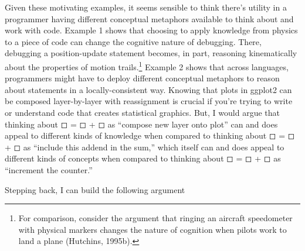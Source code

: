 Given these motivating examples, it seems sensible to think there's
utility in a programmer having different conceptual metaphors available
to think about and work with code. Example 1 shows that choosing to
apply knowledge from physics to a piece of code can change the cognitive
nature of debugging. There, debugging a position-update statement
becomes, in part, reasoning kinematically about the properties of motion
trails.\footnote{For comparison, consider the argument that ringing an
  aircraft speedometer with physical markers changes the nature of
  cognition when pilots work to land a plane (Hutchins, 1995b).} Example
2 shows that across languages, programmers might have to deploy
different conceptual metaphors to reason about statements in a
locally-consistent way. Knowing that plots in ggplot2 can be composed
layer-by-layer with reassignment is crucial if you're trying to write or
understand code that creates statistical graphics. But, I would argue
that thinking about ◻ = ◻ + ◻ as ``compose new layer onto plot'' can and
does appeal to different kinds of knowledge when compared to thinking
about ◻ = ◻ + ◻ as ``include this addend in the sum,'' which itself can
and does appeal to different kinds of concepts when compared to thinking
about ◻ = ◻ + ◻ as ``increment the counter.''

Stepping back, I can build the following argument

